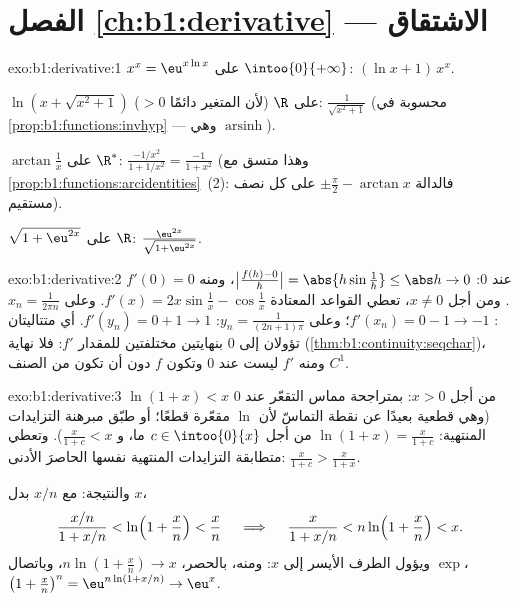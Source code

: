 \section*{الفصل \ref{ch:b1:derivative} --- الاشتقاق}

\begin{solution}{exo:b1:derivative:1}
$x^x = \eu^{x\ln x}$ على $\intoo{0}{+\infty}$:  $(\ln x +
1)\,x^x$.

$\ln(x + \sqrt{x^2+1})$ على $\R$ (لأن المتغير دائمًا $> 0$):
 $\frac{1}{\sqrt{x^2+1}}$ (محسوبة في
\cref{prop:b1:functions:invhyp} --- وهي
$\operatorname{arsinh}$).

$\arctan\frac1x$ على $\R^*$:  $\frac{-1/x^2}{1 + 1/x^2} =
\frac{-1}{1 + x^2}$ (وهذا متسق مع
\cref{prop:b1:functions:arcidentities}~(2): فالدالة
$\pm\frac\pi2 - \arctan x$ على كل نصف مستقيم).

$\sqrt{1 + \eu^{2x}}$ على $\R$: 
$\frac{\eu^{2x}}{\sqrt{1 + \eu^{2x}}}$.
\end{solution}

\begin{solution}{exo:b1:derivative:2}
عند $0$: $\bigl|\frac{f(h) - 0}{h}\bigr| = \abs{h \sin\frac1h} \leq
\abs h \to 0$، ومنه $f'(0) = 0$. ومن أجل $x \neq 0$، تعطي القواعد المعتادة
$f'(x) = 2x\sin\frac1x - \cos\frac1x$. وعلى $x_n = \frac{1}{2\pi
n}$: $f'(x_n) = 0 - 1 \to -1$؛ وعلى $y_n = \frac{1}{(2n+1)\pi}$:
$f'(y_n) = 0 + 1 \to 1$. أي متتاليتان تؤولان إلى $0$ بنهايتين مختلفتين
للمقدار $f'$: فلا نهاية (\cref{thm:b1:continuity:seqchar})، ومنه  $f'$
ليست  عند $0$ وتكون $f$  دون أن تكون من الصنف
$C^1$.
\end{solution}

\begin{solution}{exo:b1:derivative:3}
$\ln(1+x) < x$ من أجل $x > 0$: بمتراجحة مماس التقعّر عند $0$
(وهي قطعية بعيدًا عن نقطة التماسّ لأن $\ln$ مقعّرة قطعًا؛
أو طبّق مبرهنة التزايدات المنتهية: $\ln(1+x) = \frac{x}{1+c}$ من أجل
$c \in \intoo{0}{x}$ ما، و $\frac{x}{1+c} < x$). وتعطي متطابقة التزايدات
المنتهية نفسها الحاصرَ الأدنى: $\frac{x}{1+c} > \frac{x}{1+x}$.

والنتيجة: مع $x/n$ بدل $x$،
\[
\frac{x/n}{1 + x/n} < \ln\Bigl(1 + \frac xn\Bigr) < \frac xn
\quad\implies\quad
\frac{x}{1 + x/n} < n \ln\Bigl(1 + \frac xn\Bigr) < x .
\]
ويؤول الطرف الأيسر إلى $x$: ومنه، بالحصر، $n\ln(1 + \frac xn)
\to x$، وباتصال $\exp$، $\bigl(1 + \frac xn\bigr)^n =
\eu^{n\ln(1 + x/n)} \to \eu^x$.
\end{solution}

